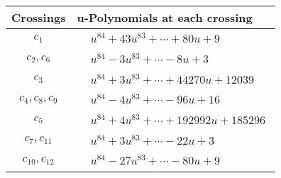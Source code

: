\documentclass[1p]{elsarticle_modified}
\theoremstyle{definition}
\begin{document}
\begin{tabular}{m{50pt}|m{274pt}}
Crossings & \hspace{64pt}u-Polynomials at each crossing \\
\hline $$\begin{aligned}c_{1}\end{aligned}$$&$\begin{aligned}
&u^{84}+43 u^{83}+\cdots+80 u+9
\end{aligned}$\\
\hline $$\begin{aligned}c_{2},c_{6}\end{aligned}$$&$\begin{aligned}
&u^{84}-3 u^{83}+\cdots-8 u+3
\end{aligned}$\\
\hline $$\begin{aligned}c_{3}\end{aligned}$$&$\begin{aligned}
&u^{84}+3 u^{83}+\cdots+44270 u+12039
\end{aligned}$\\
\hline $$\begin{aligned}c_{4},c_{8},c_{9}\end{aligned}$$&$\begin{aligned}
&u^{84}-4 u^{83}+\cdots-96 u+16
\end{aligned}$\\
\hline $$\begin{aligned}c_{5}\end{aligned}$$&$\begin{aligned}
&u^{84}+4 u^{83}+\cdots+192992 u+185296
\end{aligned}$\\
\hline $$\begin{aligned}c_{7},c_{11}\end{aligned}$$&$\begin{aligned}
&u^{84}+3 u^{83}+\cdots-22 u+3
\end{aligned}$\\
\hline $$\begin{aligned}c_{10},c_{12}\end{aligned}$$&$\begin{aligned}
&u^{84}-27 u^{83}+\cdots-80 u+9
\end{aligned}$\\
\hline
\end{tabular}\\~\\
\newpage\renewcommand{\arraystretch}{1}
\end{document}
